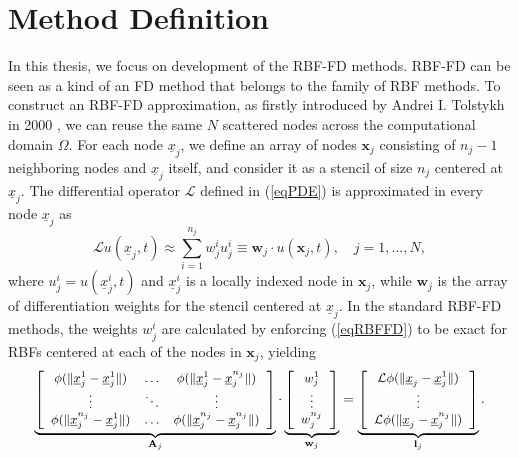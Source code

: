 \documentclass{UUThesisTemplate}
\begin{document}
\section{Method Definition}
\par In this thesis, we focus on development of the RBF-FD methods. RBF-FD can be seen as a kind of an FD method that belongs to the family of RBF methods. To construct an RBF-FD approximation, as firstly introduced by Andrei I. Tolstykh in 2000 \cite{tolstykh2000using}, we can reuse the same $N$ scattered nodes across the computational domain $\Omega$. For each node $\underline{x}_j$, we define an array of nodes $\mathbf{x}_j$ consisting of $n_j-1$ neighboring nodes and $\underline{x}_j$ itself, and consider it as a stencil of size $n_j$ centered at $\underline{x}_j$. The differential operator $\mathcal{L}$ defined in (\ref{eqPDE})  is approximated in every node  $\underline{x}_j$ as
\begin{equation}
\mathcal{L}u(\underline{x}_j, t)\approx\sum_{i=1}^{n_j}{w}_{j}^{i}u_j^{i}\equiv \mathbf{w}_j\cdot u(\mathbf{x}_j, t),\quad j=1,\ldots,N,
\label{eqRBFFD}
\end{equation}
where $u_j^{i}=u(\underline{x}_j^i,t)$ and $\underline{x}_j^i$ is a locally indexed node in $\mathbf{x}_j$, while $\mathbf{w}_j$ is the array of differentiation weights for the stencil centered at $\underline{x}_j$. In the standard RBF-FD methods, the weights ${w}_j^i$ are calculated by enforcing (\ref{eqRBFFD}) to be exact for RBFs centered at each of the nodes in $\mathbf{x}_j$, yielding
\begin{equation}
\label{eqRBFFDmat}
{\footnotesize{
\underbrace{\left[\begin{array}{cccc}
\phi(\|\underline{x}_j^{1}-\underline{x}_j^{1}\|) & \ldots & \phi(\|\underline{x}_j^{1}-\underline{x}_{j}^{n_j}\|)\\
\vdots & \ddots & \vdots\\
\phi(\|\underline{x}_{j}^{n_j}-\underline{x}_j^{1}\|) & \ldots & \phi(\|\underline{x}_{j}^{n_j}-\underline{x}_{j}^{n_j}\|)
\end{array}\right]}_{\mathbf{A}_j}
\cdot \underbrace{\left[\begin{array}{c}
{w}_j^{1}\\
\vdots\\
{w}_{j}^{n_j}
\end{array}\right]}_{\mathbf{w}_j}=
\underbrace{\left[\begin{array}{c}
\mathcal{L}\phi(\|\underline{x}_{j}-\underline{x}_j^{1}\|)\\
\vdots \\
\mathcal{L}\phi(\|\underline{x}_{j}-\underline{x}_{{j}}^{n_j}\|)
\end{array}\right]}_{\mathbf{l}_j}.}}
\end{equation}
\end{document}
